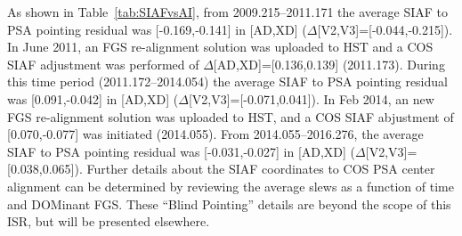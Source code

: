 As shown in Table~\ref{tab:SIAFvsAI}, from 2009.215--2011.171 the average SIAF to PSA  pointing residual was [-0.169,-0.141]\arcsec{} in [AD,XD] ($\Delta$[V2,V3]=[-0.044,-0.215]\arcsec).
In June 2011, an FGS re-alignment solution was uploaded to HST and a COS SIAF adjustment was performed of $\Delta$[AD,XD]=[0.136,0.139] (2011.173).
During this time period (2011.172--2014.054) the average SIAF to PSA  pointing residual was	[0.091,-0.042]\arcsec{} in [AD,XD] ($\Delta$[V2,V3]=[-0.071,0.041]\arcsec).
In Feb 2014, an new FGS re-alignment solution was uploaded to HST, and a COS SIAF abjustment of [0.070,-0.077]\arcsec{} was initiated (2014.055).
From 2014.055--2016.276, the average SIAF to PSA  pointing residual was	[-0.031,-0.027]\arcsec{} in [AD,XD] ($\Delta$[V2,V3]=[0.038,0.065]\arcsec{}).
Further details about the SIAF coordinates to COS PSA center alignment can be determined by reviewing the average 
slews as a function of time and DOMinant FGS. These ``Blind Pointing'' details are beyond the scope of this ISR, but will be presented elsewhere.


